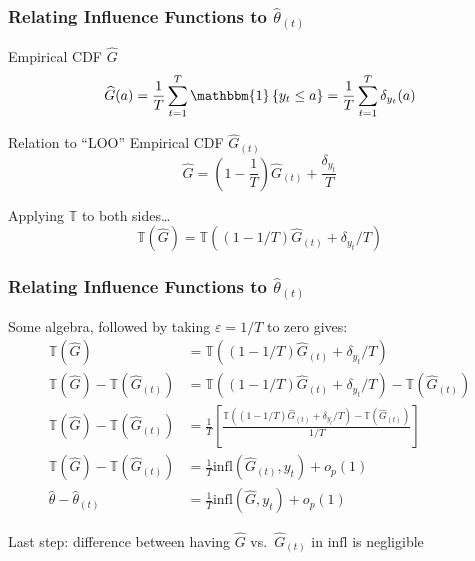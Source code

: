 \begin{frame}
  \frametitle{Relating Influence Functions to $\widehat{\theta}_{(t)}$}

  \begin{block}{Empirical CDF $\widehat{G}$}
    \vspace{-1em}
    \[\widehat{G}(a) = \displaystyle\frac{1}{T}\sum_{t=1}^T \mathbbm{1}\left\{ y_t \leq a \right\} = \displaystyle\frac{1}{T} \sum_{t=1}^T \delta_{y_t}(a)\]
  \end{block}

  \vspace{-1em}

  \begin{block}{Relation to ``LOO'' Empirical CDF $\widehat{G}_{(t)}$}
    \vspace{-1em}
  \[\displaystyle \widehat{G} = \left( 1 - \frac{1}{T} \right) \widehat{G}_{(t)} + \frac{\delta_{y_t}}{T}\]
  \end{block}

  \vspace{-1em}

  \begin{block}{Applying $\mathbb{T}$ to both sides\dots}
    \vspace{-1em}
   \[ 
      \mathbb{T}(\widehat{G}) = \mathbb{T}\left( (1 - 1/T) \widehat{G}_{(t)} + \delta_{y_t}/T\right)
    \]
  \end{block}
\end{frame}
\begin{frame}
  \frametitle{Relating Influence Functions to $\widehat{\theta}_{(t)}$}
  Some algebra, followed by taking $\varepsilon = 1/T$ to zero gives:
  \begin{align*}
      \mathbb{T}(\widehat{G}) &= \mathbb{T}\left( (1 - 1/T) \widehat{G}_{(t)} + \delta_{y_t}/T\right)\\
      \mathbb{T}(\widehat{G}) - \mathbb{T}(\widehat{G}_{(t)}) &= \mathbb{T}\left( (1 - 1/T) \widehat{G}_{(t)} + \delta_{y_t}/T\right) - \mathbb{T}(\widehat{G}_{(t)})\\
      \mathbb{T}(\widehat{G}) - \mathbb{T}(\widehat{G}_{(t)}) &= \frac{1}{T}\left[ \frac{\mathbb{T}\left( (1 - 1/T) \widehat{G}_{(t)} + \delta_{y_t}/T\right) - \mathbb{T}(\widehat{G}_{(t)})}{1/T}\right]\\
      \mathbb{T}(\widehat{G}) - \mathbb{T}(\widehat{G}_{(t)}) &= \frac{1}{T} \mbox{infl}\left(\widehat{G}_{(t)}, y_t\right) + o_p(1)\\
      \widehat{\theta} - \widehat{\theta}_{(t)} &= \frac{1}{T} \mbox{infl}\left( \widehat{G},y_t \right) + o_p(1)
    \end{align*}

    \alert{Last step: difference between having $\widehat{G}$ vs.\ $\widehat{G}_{(t)}$ in $\mbox{infl}$ is negligible}

\end{frame}
